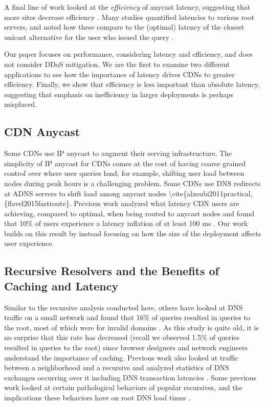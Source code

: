 \documentclass[sigconf,letterpaper,nonacm,10pt,anonymous]{acmart}
\begin{document}
A final line of work looked at the \emph{efficiency} of anycast latency,
suggesting that more sites decrease efficiency
\cite{li_levin_spring_bhattacharjee_2018}. Many studies quantified
latencies to various root servers, and noted how these compare to the
(optimal) latency of the closest unicast alternative for the user who
issued the query
\cite{colitti2006evaluating, de2017anycast, liang2013measuring}.

Our paper focuses on performance, considering latency and efficiency,
and does not consider DDoS mitigation. We are the first to examine two
different applications to see how the importance of latency drives CDNs
to greater efficiency. Finally, we show that efficiency is less
important than absolute latency, suggesting that emphasis on
inefficiency in larger deployments is perhaps misplaced.

\subsection{CDN Anycast}\label{cdn-anycast-2}

\label{sec:related_cdn_anycast}

Some CDNs \cite{calder2015analyzing,edgecast_anycast,amazon_cloudfront}
use IP anycast to augment their serving infrastructure. The simplicity
of IP anycast for CDNs comes at the cost of having coarse grained
control over where user queries land; for example, shifting user load
between nodes during peak hours is a challenging problem. Some CDNs use
DNS redirects at ADNS servers to shift load among anycast nodes
\textbackslash{}cite\{alzoubi2011practical, \{flavel2015fastroute\}.
Previous work analyzed what latency CDN users are achieving, compared to
optimal, when being routed to anycast nodes and found that 10\% of users
experience a latency inflation of at least 100 ms
\cite{calder2015analyzing}. Our work builds on this result by instead
focusing on how the size of the deployment affects user experience.

\subsection{Recursive Resolvers and the Benefits of Caching and
Latency}\label{recursive-resolvers-and-the-benefits-of-caching-and-latency}

\label{sec:related_recursive_resolver_caches}

Similar to the recursive analysis conducted here, others have looked at
DNS traffic on a small network and found that 16\% of queries resulted
in queries to the root, most of which were for invalid domains
\cite{jung2002dns}. As this study is quite old, it is no surprise that
this rate has decreased (recall we observed 1.5\% of queries resulted in
queries to the root) since browser designers and network engineers
understand the importance of caching. Previous work also looked at
traffic between a neighborhood and a recursive and analyzed statistics
of DNS exchanges occurring over it including DNS transaction latencies
\cite{callahan2013modern}. Some previous work looked at certain
pathological behaviors of popular recursives, and the implications these
behaviors have on root DNS load times
\cite{yu2012authority, lentz2013d}.
\end{document}
